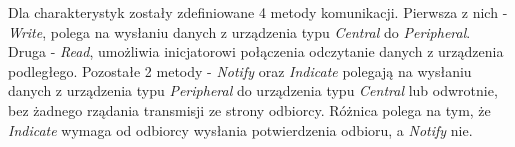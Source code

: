 Dla charakterystyk zostały zdefiniowane 4 metody komunikacji. Pierwsza z nich - \textit{Write}, polega na wysłaniu danych z urządzenia typu \textit{Central} do \textit{Peripheral}. Druga - \textit{Read}, umożliwia inicjatorowi połączenia odczytanie danych z urządzenia podległego. Pozostałe 2 metody - \textit{Notify} oraz \textit{Indicate} polegają na wysłaniu danych z urządzenia typu \textit{Peripheral} do urządzenia typu \textit{Central} lub odwrotnie, bez żadnego rządania transmisji ze strony odbiorcy. Różnica polega na tym, że \textit{Indicate} wymaga od odbiorcy wysłania potwierdzenia odbioru, a \textit{Notify} nie.

